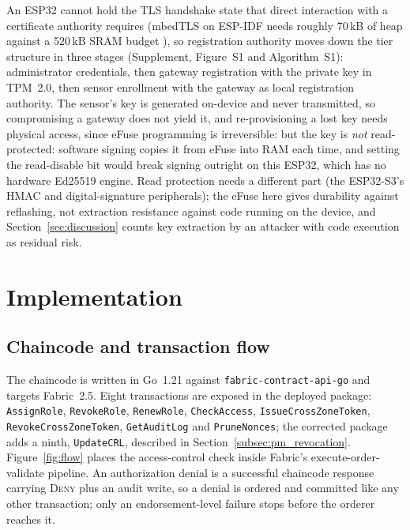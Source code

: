 \documentclass[a4paper,fleqn]{cas-dc}
\begin{document}
An ESP32 cannot hold the TLS handshake state that direct interaction with a
certificate authority requires (mbedTLS on ESP-IDF needs roughly 70\,kB of
heap against a 520\,kB SRAM budget \cite{raza2013lithe}), so registration
authority moves down the tier structure in three stages (Supplement,
Figure~S1 and Algorithm~S1): administrator credentials, then gateway
registration with the private key in TPM~2.0, then sensor enrollment with
the gateway as local registration authority. The sensor's key is generated
on-device and never transmitted, so compromising a gateway does not yield
it, and re-provisioning a lost key needs physical access, since eFuse
programming is irreversible: but the key is \emph{not} read-protected:
software signing copies it from eFuse into RAM each time, and setting the
read-disable bit would break signing outright on this ESP32, which has no
hardware Ed25519 engine. Read protection needs a different part (the
ESP32-S3's HMAC and digital-signature peripherals); the eFuse here gives
durability against reflashing, not extraction resistance against code
running on the device, and Section~\ref{sec:discussion} counts key
extraction by an attacker with code execution as residual risk.

\FloatBarrier
\section{Implementation}
\label{sec:impl}

\subsection{Chaincode and transaction flow}
\label{subsec:chaincode}

The chaincode is written in Go~1.21 against \texttt{fabric-contract-api-go}
and targets Fabric~2.5. Eight transactions are exposed in the deployed
package: \texttt{AssignRole}, \texttt{RevokeRole}, \texttt{RenewRole},
\texttt{CheckAccess}, \texttt{IssueCrossZoneToken},
\texttt{RevokeCrossZoneToken}, \texttt{GetAuditLog} and \texttt{PruneNonces};
the corrected package adds a ninth, \texttt{UpdateCRL}, described in
Section~\ref{subsec:pm_revocation}. Figure~\ref{fig:flow} places the
access-control check inside Fabric's execute-order-validate pipeline. An
authorization denial is a successful chaincode response carrying
\textsc{Deny} plus an audit write, so a denial is ordered and committed like
any other transaction; only an endorsement-level failure stops before the
orderer reaches it.
\end{document}

